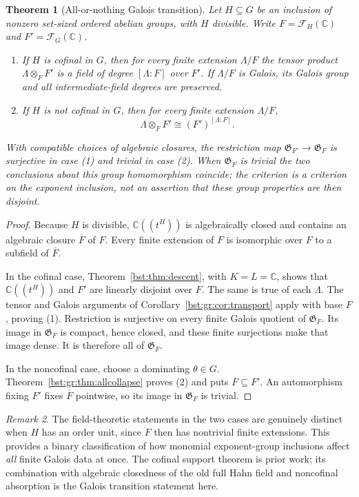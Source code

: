 \documentclass[11pt,letterpaper]{article}
\newtheorem{theorem}{Theorem}[section]
\theoremstyle{definition}
\theoremstyle{remark}
\newtheorem{remark}[theorem]{Remark}
\newcommand{\C}{\mathbb C}
\newcommand{\HH}[2]{#1((t^{#2}))}
\newcommand{\FF}[2]{\mathcal F_{#2}(#1)}
\newcommand{\AbsGal}[1]{\mathfrak G_{#1}}
\begin{document}
\begin{theorem}[All-or-nothing Galois transition]\label{bst:gr:thm:transition}
Let $H\subseteq G$ be an inclusion of nonzero set-sized ordered abelian
groups, with $H$ divisible. Write $F=\FF{\C}H$ and $F'=\FF{\C}G$.
\begin{enumerate}
\item If $H$ is cofinal in $G$, then for every finite extension $\Lambda/F$
the tensor product $\Lambda\otimes_FF'$ is a field of degree $[\Lambda:F]$ over
$F'$. If $\Lambda/F$ is Galois, its Galois group and all intermediate-field
degrees are preserved.
\item If $H$ is not cofinal in $G$, then for every finite extension
$\Lambda/F$,
\[
 \Lambda\otimes_FF'\cong(F')^{[\Lambda:F]}.
\]
\end{enumerate}
With compatible choices of algebraic closures, the restriction map
$\AbsGal{F'}\to\AbsGal F$ is surjective in case \textup{(1)} and trivial in
case \textup{(2)}. When $\AbsGal F$ is trivial the two conclusions about
this group homomorphism coincide; the criterion is a criterion on the
exponent inclusion, not an assertion that these group properties are then
disjoint.
\end{theorem}
\begin{proof}
Because $H$ is divisible, $\HH{\C}H$ is algebraically closed and contains an
algebraic closure $\overline F$ of $F$. Every finite extension of $F$ is
isomorphic over $F$ to a subfield of $\overline F$.

In the cofinal case, Theorem~\ref{bst:thm:descent}, with $K=L=\C$, shows that
$\HH{\C}H$ and $F'$ are linearly disjoint over $F$. The same is true of each
$\Lambda$. The tensor and Galois arguments of
Corollary~\ref{bst:gr:cor:transport} apply with base $F$, proving (1).
Restriction is surjective on every finite Galois quotient of $\AbsGal F$. Its
image in $\AbsGal F$ is compact, hence closed, and these finite surjections
make that image dense. It is therefore all of $\AbsGal F$.

In the noncofinal case, choose a dominating $\theta\in G$.
Theorem~\ref{bst:gr:thm:allcollapse} proves (2) and puts
$\overline F\subseteq F'$. An automorphism fixing $F'$ fixes $\overline F$
pointwise, so its image in $\AbsGal F$ is trivial.
\end{proof}

\begin{remark}\label{bst:gr:rem:binary}
The field-theoretic statements in the two cases are genuinely distinct when
$H$ has an order unit, since $F$ then has nontrivial finite extensions. This
provides a binary classification of how monomial exponent-group inclusions
affect \emph{all} finite Galois data at once. The cofinal support theorem is
prior work; its combination with algebraic closedness of the old full Hahn
field and noncofinal absorption is the Galois transition statement here.
\end{remark}
\end{document}
